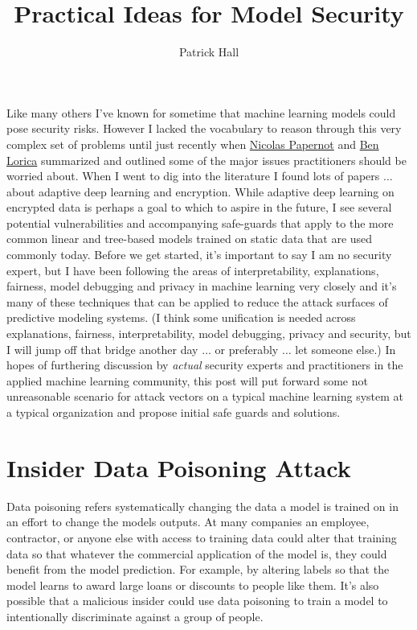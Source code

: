 \documentclass[fleqn]{article}
\title{Practical Ideas for Model Security}
\author{Patrick Hall}
\begin{document}
\maketitle

Like many others I've known for sometime that machine learning models could pose security risks. However I lacked the vocabulary to reason through this very complex set of problems until just recently when \href{https://arxiv.org/pdf/1811.01134.pdf}{Nicolas Papernot} and \href{https://www.oreilly.com/ideas/you-created-a-machine-learning-application-now-make-sure-its-secure}{Ben Lorica} summarized and outlined some of the major issues practitioners should be worried about. When I went to dig into the literature I found lots of papers ... about adaptive deep learning and encryption. While adaptive deep learning on encrypted data is perhaps a goal to which to aspire in the future, I see several potential vulnerabilities and accompanying safe-guards that apply to the more common linear and tree-based models trained on static data that are used commonly today.  Before we get started, it's important to say I am no security expert, but I have been following the areas of interpretability, explanations, fairness, model debugging and privacy in machine learning very closely and it's many of these techniques that can be applied to reduce the attack surfaces of predictive modeling systems. (I think some unification is needed across explanations, fairness, interpretability, model debugging, privacy and security, but I will jump off that bridge another day $\dots$ or preferably $\dots$ let someone else.) In hopes of furthering discussion by \textit{actual} security experts and practitioners in the applied machine learning community, this post will put forward some not unreasonable scenario for attack vectors on a typical machine learning system at a typical organization and propose initial safe guards and solutions. 

\section{Insider Data Poisoning Attack}

Data poisoning refers systematically changing the data a model is trained on in an effort to change the models outputs. At many companies an employee, contractor, or anyone else with access to training data could alter that training data so that whatever the commercial application of the model is, they could benefit from the model prediction.  For example, by altering labels so that the model learns to award large loans or discounts to people like them. It's also possible that a malicious insider could use data poisoning to train a model to intentionally discriminate against a group of people.\\
\end{document}
